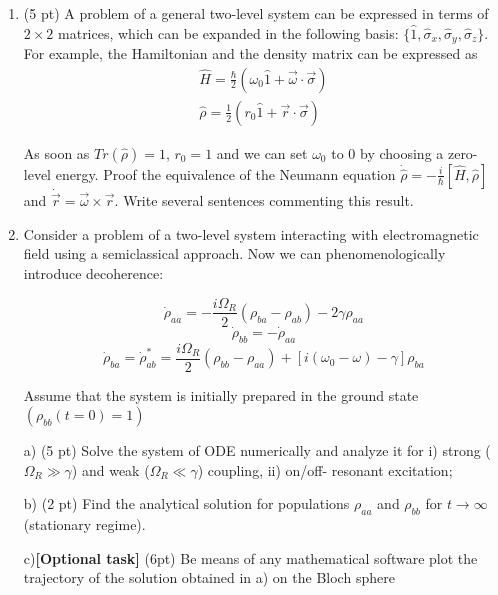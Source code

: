 \begin{hw}

	\begin{enumerate}
		\item (5 pt) A problem of a general two-level system can be expressed in terms of $2\times2$ matrices, which can be expanded in the following basis: $\{\hat 1, \hat\sigma_x,  \hat \sigma_y, \hat \sigma_z \}$. For example, the Hamiltonian and the density matrix can be expressed as
		\begin{eqnarray}
		\hat H = \frac{\hbar}{2}  \left( \omega_0 \hat 1 + \vec{\omega}  \cdot  \vec{ \sigma}  \right) \nonumber\\
		\hat \rho = \frac{1}{2}\left( r_0 \hat 1 + \vec{r}\cdot\vec{ \sigma }\right)\nonumber
		\end{eqnarray}
		
		As soon as $Tr(\hat \rho)=1$, $r_0=1$ and we can set $\omega_0$ to $0$ by choosing a zero-level energy. Proof the equivalence of the Neumann equation $\dot {\hat \rho} = -\frac{i}{\hbar}[\hat H, \hat \rho]$ and $ \dot {\vec{r}} = \vec{\omega } \times \vec{r}$. Write several sentences commenting this result.
		
		\item Consider a problem of a two-level system interacting with electromagnetic field using a semiclassical approach. Now we can phenomenologically introduce decoherence:
		
		$$
		\dot{\rho}_{aa}=-\dfrac{i\Omega_{R}}2(\rho_{ba}-\rho_{ab})-2\gamma\rho_{aa}
		$$
		$$
		\dot{\rho}_{bb}=-\dot{\rho}_{aa}
		$$
		$$
		\dot{\rho}_{ba}=\dot{\rho}^{*}_{ab}=\dfrac{i\Omega_{R}}2(\rho_{bb}-\rho_{aa})+\left[i(\omega_{0}-\omega)-\gamma\right]\rho_{ba}
		$$
		
		Assume that the system is initially prepared in the ground state $(\rho_{bb}(t=0)=1)$
		
		a) (5 pt) Solve the system of ODE numerically and analyze it for i) strong ($\Omega_{R}\gg\gamma$) and weak ($\Omega_{R}\ll\gamma$) coupling, ii) on/off- resonant excitation;
		
		b) (2 pt) Find the analytical solution for populations $\rho_{aa}$ and $\rho_{bb}$ for $t\rightarrow \infty$ (stationary regime).
		
		c){\bf [Optional task] }(6pt) Be means of any mathematical software plot the trajectory of the solution obtained in a) on the Bloch sphere
	\end{enumerate}	

\end{hw}


